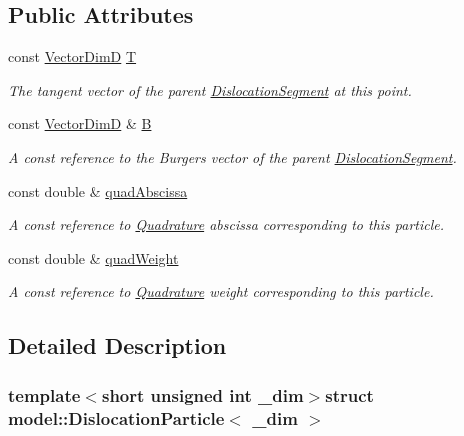 \subsection*{Public Attributes}
\begin{DoxyCompactItemize}
\item 
const \hyperlink{structmodel_1_1_dislocation_particle_ac31483dc9c0a9aef3dde10fa00583b39}{Vector\+Dim\+D} \hyperlink{structmodel_1_1_dislocation_particle_a2e4c468c20b98459256a746dca56701d}{T}
\begin{DoxyCompactList}\small\item\em The tangent vector of the parent \hyperlink{classmodel_1_1_dislocation_segment}{Dislocation\+Segment} at this point. \end{DoxyCompactList}\item 
const \hyperlink{structmodel_1_1_dislocation_particle_ac31483dc9c0a9aef3dde10fa00583b39}{Vector\+Dim\+D} \& \hyperlink{structmodel_1_1_dislocation_particle_a3a8d05e9d1d7a9925be1a20dece52310}{B}
\begin{DoxyCompactList}\small\item\em A const reference to the Burgers vector of the parent \hyperlink{classmodel_1_1_dislocation_segment}{Dislocation\+Segment}. \end{DoxyCompactList}\item 
const double \& \hyperlink{structmodel_1_1_dislocation_particle_a8c6fc5a8adbbfd82309b87e1f69d246b}{quad\+Abscissa}
\begin{DoxyCompactList}\small\item\em A const reference to \hyperlink{structmodel_1_1_quadrature}{Quadrature} abscissa corresponding to this particle. \end{DoxyCompactList}\item 
const double \& \hyperlink{structmodel_1_1_dislocation_particle_a1973a8355d41b8d97ab4dd7f2b08ad8f}{quad\+Weight}
\begin{DoxyCompactList}\small\item\em A const reference to \hyperlink{structmodel_1_1_quadrature}{Quadrature} weight corresponding to this particle. \end{DoxyCompactList}\end{DoxyCompactItemize}


\subsection{Detailed Description}
\subsubsection*{template$<$short unsigned int \+\_\+dim$>$struct model\+::\+Dislocation\+Particle$<$ \+\_\+dim $>$}



